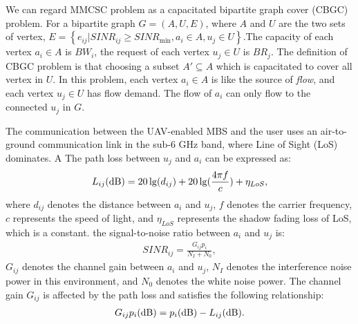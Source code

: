 \documentclass[11pt,a4paper]{article}
\begin{document}
We can regard MMCSC problem as a capacitated bipartite graph cover (CBGC) problem. For a bipartite graph $G=(A,U,E)$, where $A$ and $U$ are the two sets of vertex, $E = \left\{ e_{ij} | SINR_{ij} \ge SINR_{\min}, a_i \in A, u_j \in U\right\}$.The capacity of each vertex $a_i \in A$ is $BW_i$, the request of each vertex $u_j \in U$ is $BR_j$. The definition of CBGC problem is that choosing a subset $A' \subseteq A$ which is capacitated to cover all vertex in $U$. In this problem, each vertex $a_i \in A$ is like the source of \emph{flow}, and each vertex $u_j \in U$ has flow demand. The flow of $a_i$ can only flow to the connected $u_j$ in $G$. 



The communication between the UAV-enabled MBS and the user uses an air-to-ground communication link in the sub-6 GHz band, where Line of Sight (LoS) dominates. A The path loss between $u_j$ and $a_i$ can be expressed as:
\begin{eqnarray}
	{L_{ij}}({\rm{dB}}) = 20\lg ({d_{ij}}) + 20\lg (\frac{{4\pi f}}{c}) + {\eta _{LoS}},
\end{eqnarray}
where $d_{ij}$ denotes the distance between $a_i$ and $u_j$, $f$ denotes the carrier frequency, $c$ represents the speed of light, and $\eta _{LoS}$ represents the shadow fading loss of LoS, which is a constant. the signal-to-noise ratio between $a_i$ and $u_j$ is:
\begin{eqnarray}
	SINR_{ij} = \frac{{{G_{ij}}{p_i}}}{{{N_I} + {N_0}}},
\end{eqnarray}
$G_{ij}$ denotes the channel gain between $a_i$ and $u_j$, $N_I$ denotes the interference noise power in this environment, and $N_0$ denotes the white noise power. The channel gain $G_{ij}$ is affected by the path loss and satisfies the following relationship:
\begin{eqnarray}
	{G_{ij}}{p_i}({\rm{dB}}) = {p_i}({\rm{dB}}) - {L_{ij}}({\rm{dB}}).
\end{eqnarray}
\end{document}
